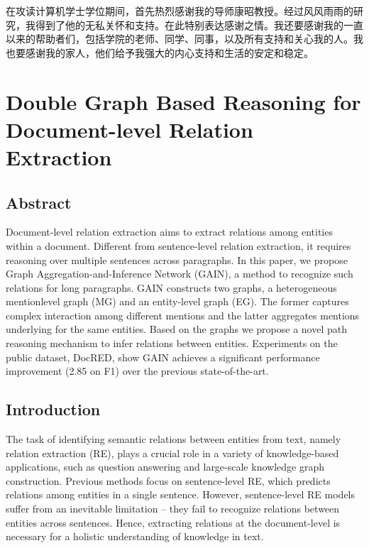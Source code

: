 \documentclass[bachelor]{thesis-uestc}
\begin{document}
\thesisacknowledgement
在攻读计算机学士学位期间，首先热烈感谢我的导师康昭教授。经过风风雨雨的研究，我得到了他的无私关怀和支持。在此特别表达感谢之情。我还要感谢我的一直以来的帮助者们，包括学院的老师、同学、同事，以及所有支持和关心我的人。我也要感谢我的家人，他们给予我强大的内心支持和生活的安定和稳定。

%

%
%





\thesistranslationoriginal
\section{Double Graph Based Reasoning for Document-level Relation Extraction}

\subsection{Abstract}

Document-level relation extraction aims to extract relations among entities within a document. Different from sentence-level relation extraction, it requires reasoning over multiple sentences across paragraphs. In this paper, we propose Graph Aggregation-and-Inference Network (GAIN), a method to recognize such relations for long paragraphs. GAIN constructs two graphs, a heterogeneous mentionlevel graph (MG) and an entity-level graph (EG). The former captures complex interaction among different mentions and the latter aggregates mentions underlying for the same entities. Based on the graphs we propose a novel path reasoning mechanism to infer relations between entities. Experiments on the public dataset, DocRED, show GAIN achieves a significant performance improvement (2.85 on F1) over the previous state-of-the-art. \par

\subsection{Introduction}

The task of identifying semantic relations between entities from text, namely relation extraction (RE), plays a crucial role in a variety of knowledge-based applications, such as question answering  and large-scale knowledge graph construction. Previous methods focus on sentence-level RE, which predicts relations among entities in a single sentence. However, sentence-level RE models suffer from an inevitable limitation – they fail to recognize relations between entities across sentences. Hence, extracting relations at the document-level is necessary for a holistic understanding of knowledge in text. \par
\end{document}
